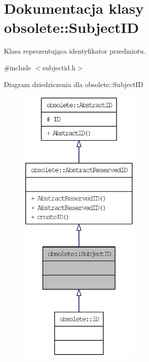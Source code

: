 \hypertarget{classobsolete_1_1SubjectID}{
\section{Dokumentacja klasy obsolete::SubjectID}
\label{classobsolete_1_1SubjectID}
}


Klasa reprezentująca identyfikator przedmiotu.  




{\ttfamily \#include $<$subjectid.h$>$}



Diagram dziedziczenia dla obsolete::SubjectID\nopagebreak
\begin{figure}[H]
\begin{center}
\leavevmode
\includegraphics[height=400pt]{classobsolete_1_1SubjectID__inherit__graph}
\end{center}
\end{figure}


